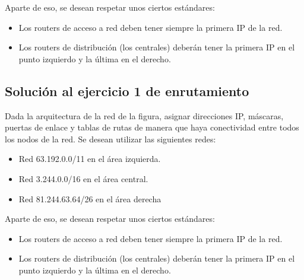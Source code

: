 \documentclass[letterpaper,10pt,spanish]{sphinxmanual}
\begin{document}
\begin{figure}[htbp]
\centering

\noindent{}
\end{figure}

\sphinxAtStartPar
Aparte de eso, se desean respetar unos ciertos estándares:
\begin{itemize}
\item {} 
\sphinxAtStartPar
Los routers de acceso a red deben tener siempre la primera IP de la red.

\item {} 
\sphinxAtStartPar
Los routers de distribución (los centrales) deberán tener la primera IP en el punto izquierdo y la última en el derecho.

\end{itemize}


\subsection{Solución al ejercicio 1 de enrutamiento}
\label{\detokenize{t2_integracion_elementos/ejercicios_subredes_ipv4/ejercicios_dos_router:solucion-al-ejercicio-1-de-enrutamiento}}
\sphinxAtStartPar
Dada la arquitectura de la red de la figura, asignar direcciones IP, máscaras, puertas de enlace y tablas de rutas de manera que haya conectividad entre todos
los nodos de la red. Se desean utilizar las siguientes redes:
\begin{itemize}
\item {} 
\sphinxAtStartPar
Red 63.192.0.0/11 en el área izquierda.

\item {} 
\sphinxAtStartPar
Red 3.244.0.0/16 en el área central.

\item {} 
\sphinxAtStartPar
Red 81.244.63.64/26 en el área derecha

\end{itemize}

\begin{figure}[htbp]
\centering

\noindent{}
\end{figure}

\sphinxAtStartPar
Aparte de eso, se desean respetar unos ciertos estándares:
\begin{itemize}
\item {} 
\sphinxAtStartPar
Los routers de acceso a red deben tener siempre la primera IP de la red.

\item {} 
\sphinxAtStartPar
Los routers de distribución (los centrales) deberán tener la primera IP en el punto izquierdo y la última en el derecho.

\end{itemize}
\end{document}

